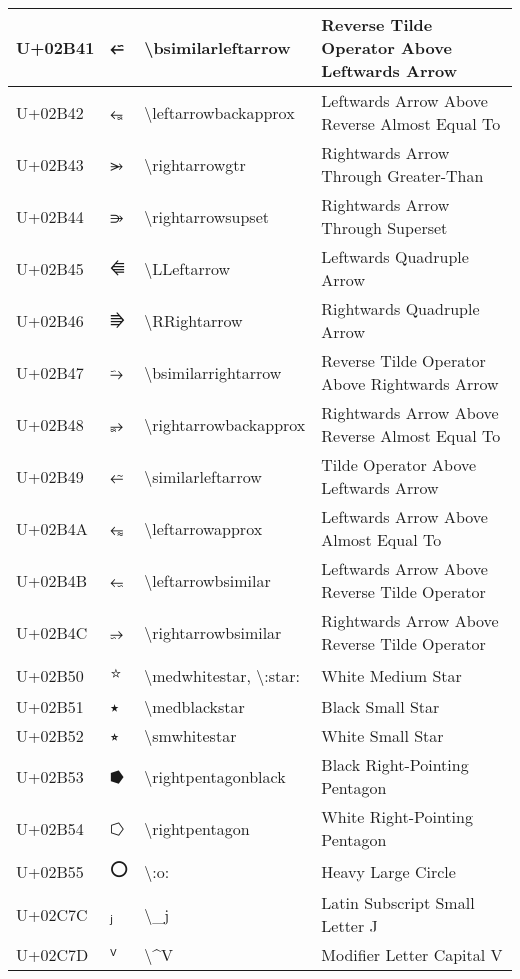 \begin{table}[h]
\begin{tabulary}{\linewidth}{|L|L|L|L|}
\hline
U+02B41 & ⭁ & {\textbackslash}bsimilarleftarrow & Reverse Tilde Operator Above Leftwards Arrow \\
\hline
U+02B42 & ⭂ & {\textbackslash}leftarrowbackapprox & Leftwards Arrow Above Reverse Almost Equal To \\
\hline
U+02B43 & ⭃ & {\textbackslash}rightarrowgtr & Rightwards Arrow Through Greater-Than \\
\hline
U+02B44 & ⭄ & {\textbackslash}rightarrowsupset & Rightwards Arrow Through Superset \\
\hline
U+02B45 & ⭅ & {\textbackslash}LLeftarrow & Leftwards Quadruple Arrow \\
\hline
U+02B46 & ⭆ & {\textbackslash}RRightarrow & Rightwards Quadruple Arrow \\
\hline
U+02B47 & ⭇ & {\textbackslash}bsimilarrightarrow & Reverse Tilde Operator Above Rightwards Arrow \\
\hline
U+02B48 & ⭈ & {\textbackslash}rightarrowbackapprox & Rightwards Arrow Above Reverse Almost Equal To \\
\hline
U+02B49 & ⭉ & {\textbackslash}similarleftarrow & Tilde Operator Above Leftwards Arrow \\
\hline
U+02B4A & ⭊ & {\textbackslash}leftarrowapprox & Leftwards Arrow Above Almost Equal To \\
\hline
U+02B4B & ⭋ & {\textbackslash}leftarrowbsimilar & Leftwards Arrow Above Reverse Tilde Operator \\
\hline
U+02B4C & ⭌ & {\textbackslash}rightarrowbsimilar & Rightwards Arrow Above Reverse Tilde Operator \\
\hline
U+02B50 & ⭐ & {\textbackslash}medwhitestar, {\textbackslash}:star: & White Medium Star \\
\hline
U+02B51 & ⭑ & {\textbackslash}medblackstar & Black Small Star \\
\hline
U+02B52 & ⭒ & {\textbackslash}smwhitestar & White Small Star \\
\hline
U+02B53 & ⭓ & {\textbackslash}rightpentagonblack & Black Right-Pointing Pentagon \\
\hline
U+02B54 & ⭔ & {\textbackslash}rightpentagon & White Right-Pointing Pentagon \\
\hline
U+02B55 & ⭕ & {\textbackslash}:o: & Heavy Large Circle \\
\hline
U+02C7C & ⱼ & {\textbackslash}\_j & Latin Subscript Small Letter J \\
\hline
U+02C7D & ⱽ & {\textbackslash}{\textasciicircum}V & Modifier Letter Capital V \\

\end{tabulary}
\end{table}
